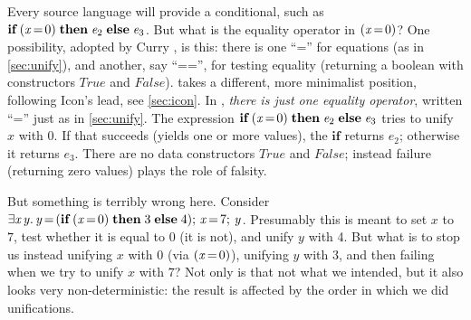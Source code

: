 \documentclass[acmsmall]{acmart}
\newcommand{\Conid}[1]{\mathit{#1}}
\newcommand{\Varid}[1]{\mathit{#1}}
\begin{document}
Every source language will provide a conditional, such as \ensuremath{\textbf{if}\;(\Varid{x}\hspace{-0.14em}=\hspace{-0.14em}\mathrm{0})\;\textbf{then}\;\Varid{e}_{\mathrm{2}}\;\textbf{else}\;\Varid{e}_{\mathrm{3}}}.  But what is the equality operator in \ensuremath{(\Varid{x}\hspace{-0.14em}=\hspace{-0.14em}\mathrm{0})}?  One
possibility, adopted by Curry \cite[\S 3.4]{curry:tutorial}, is this: there is one ``='' for
equations (as in \cref{sec:unify}), and another, say ``=='', for
testing equality (returning a boolean with constructors \ensuremath{\Conid{True}} and \ensuremath{\Conid{False}}).  \versecalc{} takes a
different, more minimalist position, following Icon's lead, see \cref{sec:icon}.
In \versecalc{}, \emph{there is just one equality operator}, written ``='' just as in
\cref{sec:unify}. The expression \ensuremath{\textbf{if}\;(\Varid{x}\hspace{-0.14em}=\hspace{-0.14em}\mathrm{0})\;\textbf{then}\;\Varid{e}_{\mathrm{2}}\;\textbf{else}\;\Varid{e}_{\mathrm{3}}} tries to unify \ensuremath{\Varid{x}} with \ensuremath{\mathrm{0}}.  If that succeeds (yields one or more values),
the \ensuremath{\textbf{if}} returns \ensuremath{\Varid{e}_{\mathrm{2}}}; otherwise it returns \ensuremath{\Varid{e}_{\mathrm{3}}}.  There are no data constructors \ensuremath{\Conid{True}} and \ensuremath{\Conid{False}}; instead
failure (returning zero values) plays the role of falsity.

But something is terribly wrong here.  Consider \ensuremath{\exists\Varid{x}\hspace{0.1em}\Varid{y}.\,\Varid{y}\hspace{-0.14em}=\hspace{-0.14em}(\textbf{if}\;(\Varid{x}\hspace{-0.14em}=\hspace{-0.14em}\mathrm{0})\;\textbf{then}\;\mathrm{3}\;\textbf{else}\;\mathrm{4});\,\Varid{x}\hspace{-0.14em}=\hspace{-0.14em}\mathrm{7};\,\Varid{y}}.
Presumably this is meant
to set \ensuremath{\Varid{x}} to \ensuremath{\mathrm{7}}, test whether it is equal to \ensuremath{\mathrm{0}} (it is not), and unify \ensuremath{\Varid{y}} with 4.
But what is to stop us instead unifying \ensuremath{\Varid{x}} with \ensuremath{\mathrm{0}} (via \ensuremath{(\Varid{x}\hspace{-0.14em}=\hspace{-0.14em}\mathrm{0})}), unifying \ensuremath{\Varid{y}} with \ensuremath{\mathrm{3}}, and then
failing when we try to unify \ensuremath{\Varid{x}} with \ensuremath{\mathrm{7}}?  Not only is that not what we intended, but it also looks very
non-deterministic: the result is affected by the order in which we did unifications.
\end{document}
